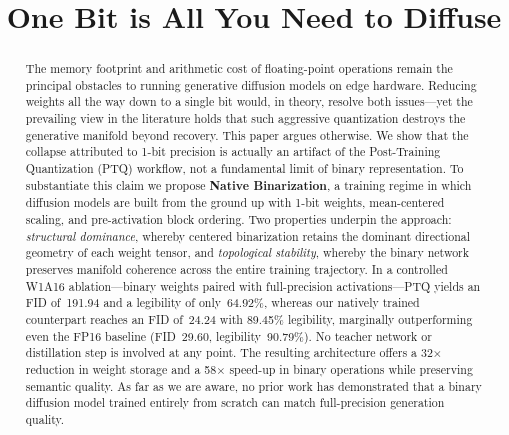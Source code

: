 \documentclass[twocolumn, journal]{IEEEtran}
\begin{document}
\title{One Bit is All You Need to Diffuse}

\author{
\and
{}
\and
{}
\and 
{}
\and
{}
}

\maketitle

\begin{abstract}
The memory footprint and arithmetic cost of floating-point operations remain the
principal obstacles to running generative diffusion models on edge hardware. Reducing
weights all the way down to a single bit would, in theory, resolve both issues---yet
the prevailing view in the literature holds that such aggressive quantization destroys
the generative manifold beyond recovery. This paper argues otherwise. We show that the
collapse attributed to 1-bit precision is actually an artifact of the
Post-Training Quantization (PTQ) workflow, not a fundamental limit of binary
representation. To substantiate this claim we propose \textbf{Native Binarization}, a
training regime in which diffusion models are built from the ground up with 1-bit
weights, mean-centered scaling, and pre-activation block ordering. Two properties
underpin the approach: \emph{structural dominance}, whereby centered binarization
retains the dominant directional geometry of each weight tensor, and
\emph{topological stability}, whereby the binary network preserves manifold coherence
across the entire training trajectory. In a controlled W1A16 ablation---binary weights
paired with full-precision activations---PTQ yields an FID of~191.94 and a legibility
of only~64.92\%, whereas our natively trained counterpart reaches an FID of~24.24 with
89.45\% legibility, marginally outperforming even the FP16 baseline (FID~29.60,
legibility~90.79\%). No teacher network or distillation step is involved at any point.
The resulting architecture offers a 32$\times$ reduction in weight storage and a
58$\times$ speed-up in binary operations while preserving semantic quality. As far as
we are aware, no prior work has demonstrated that a binary diffusion model trained
entirely from scratch can match full-precision generation quality.
\end{abstract}
\end{document}
